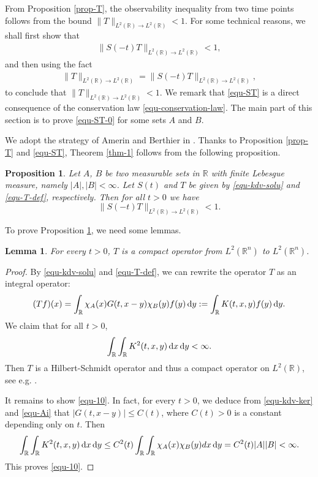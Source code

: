 \documentclass[preprint,12pt]{elsarticle}
\def\R {\mathbb{R}}
\def\d{{\,\rm d}}
\newtheorem{lemma}{Lemma}[section]
\newtheorem{proposition}{Proposition}[section]
\begin{document}
From Proposition \ref{prop-T}, the observability inequality from two time points follows from the bound $\|T\|_{L^2(\R)\to L^2(\R)}< 1$. For some technical reasons, we shall first show that
\begin{align}\label{equ-ST-0}
\|S(-t)T\|_{L^2(\R)\to L^2(\R)}<1,
\end{align}
and then using the fact
\begin{align}\label{equ-ST}
\|T\|_{L^2(\R)\to L^2(\R)}=\|S(-t)T\|_{L^2(\R)\to L^2(\R)},
\end{align}
to conclude that $\|T\|_{L^2(\R)\to L^2(\R)}< 1$. We remark that \eqref{equ-ST} is a direct consequence of  the conservation law \eqref{equ-conservation-law}. The main part of this section is to prove \eqref{equ-ST-0} for some sets $A$ and $B$.

We adopt the strategy of Amerin and Berthier in \cite{Amrein}. Thanks to Proposition \ref{prop-T} and \eqref{equ-ST}, Theorem  \ref{thm-1} follows from the following proposition.
\begin{proposition}\label{prop-3}
Let $A$, $B$ be two measurable sets in $\R$ with finite Lebesgue measure, namely $|A|,|B|<\infty$. Let $S(t)$ and $T$ be given by \eqref{equ-kdv-solu} and \eqref{equ-T-def}, respectively. Then for all $t>0$ we have
$$
\|S(-t)T\|_{L^2(\R)\to L^2(\R)}<1.
$$
\end{proposition}

To prove Proposition \ref{prop-3}, we need some lemmas.

\begin{lemma}\label{lem-T-comp}
For every $t>0$, $T$ is a compact operator from $L^2(\R^n)$ to $L^2(\R^n)$.
\end{lemma}
\begin{proof}
By \eqref{equ-kdv-solu} and \eqref{equ-T-def}, we can rewrite the operator $T$ as an integral operator:
$$
(Tf)(x)=\int_{\R }\chi_A(x)G(t,x-y)\chi_B(y)f(y)\d y:=\int_{\R } K(t,x,y)f(y)\d y.
$$
We claim that for all $t>0$,
\begin{align}\label{equ-10}
 \int_{\R }\int_{\R } K^2(t,x,y)\d x \d y<\infty.
\end{align}
Then $T$ is a Hilbert-Schmidt operator and thus a compact operator on $L^2(\R )$, see e.g. \cite[p.277]{Yosida}.

It remains to show \eqref{equ-10}. In fact, for every $t>0$, we deduce from \eqref{equ-kdv-ker} and \eqref{equ-Ai} that $|G(t,x-y)|\leq C(t)$, where $C(t)>0$ is a constant depending only on $t$. Then
\begin{align*}
 \int_\R\int_\R K^2(t,x,y)\d x \d y\leq  C^2(t) \int_\R\int_\R \chi_A(x)\chi_B(y)d x \d y=C^2(t)|A||B|<\infty.
\end{align*}
This proves \eqref{equ-10}.
\end{proof}
\end{document}
